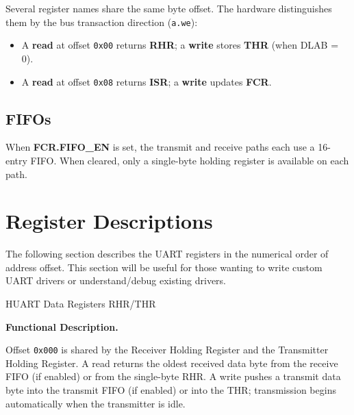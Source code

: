 Several register names share the same byte offset. The hardware distinguishes them by the
bus transaction direction (\texttt{a.we}):

\begin{itemize}[nosep]
  \item A \textbf{read} at offset \texttt{0x00} returns \textbf{RHR}; a \textbf{write}
        stores \textbf{THR} (when DLAB = 0).
  \item A \textbf{read} at offset \texttt{0x08} returns \textbf{ISR}; a \textbf{write}
        updates \textbf{FCR}.
\end{itemize}

\subsection{FIFOs}

When \textbf{FCR.FIFO\_EN} is set, the transmit and receive paths each use a 16-entry FIFO.
When cleared, only a single-byte holding register is available on each path.

\section{Register Descriptions} 
The following section describes the UART registers in the numerical order of address offset. This section will be useful for those wanting to write custom UART drivers or understand/debug existing drivers. 



\begin{register}{H}{UART Data Registers RHR/THR}{}



\end{register}


\textbf{Functional Description.}

Offset \texttt{0x000} is shared by the Receiver Holding Register and the Transmitter Holding Register. A read returns the oldest received data byte from the receive FIFO (if enabled) or from the single-byte RHR. A write pushes a transmit data byte into the transmit FIFO (if enabled) or into the THR; transmission begins automatically when the transmitter is idle.

